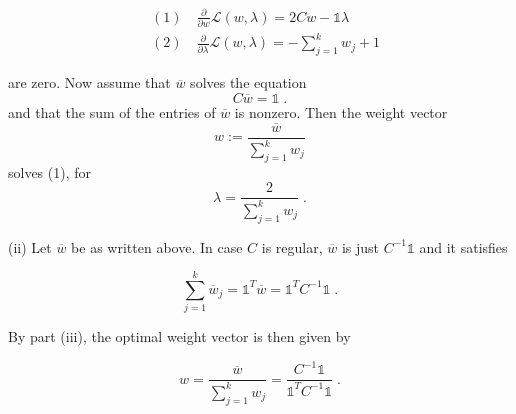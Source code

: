 \begin{align}
   &(1) \quad \frac{\partial}{\partial w} \mathcal{L}(w, \lambda) = 2Cw - \mathbb{1}\lambda \\ 
   &(2) \quad \frac{\partial}{\partial \lambda} \mathcal{L}(w, \lambda) = - \sum_{j=1}^k w_j + 1 
\end{align}

are zero. Now assume that $\overline{w}$ solves the equation $$ C\overline{w} = \mathbb{1} \; . $$ and that the sum of the entries of $\overline{w}$ is nonzero. Then the weight vector $$w := \frac{\overline{w}}{\sum_{j=1}^k w_j}$$ solves (1), for $$\lambda = \frac{2}{ \sum_{j=1}^k w_j} \; .$$

(ii) Let $\overline{w}$ be as written above. In case $C$ is regular, $\overline{w}$ is just $C^{-1}\mathbb{1}$ and it satisfies

$$ \sum_{j=1}^k \overline{w}_j = \mathbb{1}^T \overline{w} = \mathbb{1}^T C^{-1} \mathbb{1} \; .$$

By part (iii), the optimal weight vector is then given by

$$ w = \frac{\overline{w}}{\sum_{j=1}^k w_j} =\frac{C^{-1} \mathbb{1}}{\mathbb{1}^T C^{-1} \mathbb{1}} \; .$$ 
